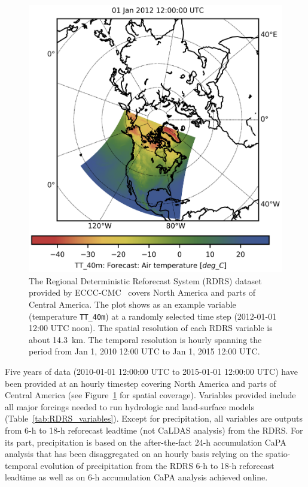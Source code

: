 \documentclass{article}
\begin{document}
	\begin{figure}[h]
		\centering
		\includegraphics[width=0.45\linewidth]{figures/rdrs_domain.png}
		\caption{The Regional Deterministic Reforecast System (RDRS) dataset provided by ECCC-CMC~\citep{gasset2017c,gasset2018a} covers North America and parts of Central America. The plot shows as an example variable (temperature \texttt{TT\_40m}) at a randomly selected time step (2012-01-01 12:00 UTC noon). The spatial resolution of each RDRS variable is about 14.3~km. The temporal resolution is hourly spanning the period from Jan 1, 2010 12:00 UTC to Jan 1, 2015 12:00 UTC.}
		\label{fig:RDRS_domain}
	\end{figure}
	
	Five years of data (2010-01-01 12:00:00 UTC to 2015-01-01 12:00:00 UTC) have been provided at an hourly timestep covering North America and parts of Central America (see Figure~\ref{fig:RDRS_domain} for spatial coverage). Variables provided include all major forcings needed to run hydrologic and land-surface models (Table~\ref{tab:RDRS_variables}).
	Except for precipitation, all variables are outputs from 6-h to 18-h reforecast leadtime (not CaLDAS analysis) from the RDRS.  For its part, precipitation is based on the after-the-fact 24-h accumulation CaPA analysis that has been disaggregated on an hourly basis relying on the spatio-temporal evolution of precipitation from the RDRS 6-h to 18-h reforecast leadtime as well as on 6-h accumulation CaPA analysis achieved online. 
	
\end{document}
